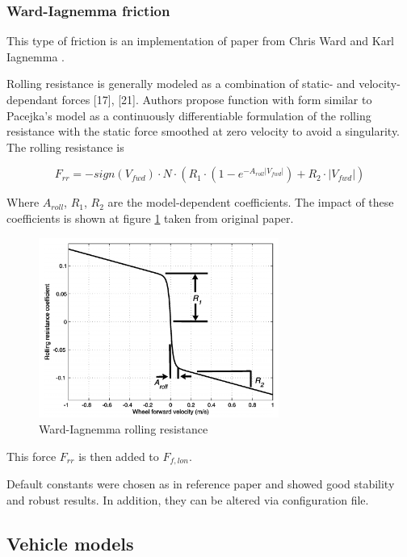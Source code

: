 \documentclass[a4paper,11pt]{article}
\begin{document}
\newpage
\subsubsection{Ward-Iagnemma friction}\label{sec:wi_friction}
This type of friction is an implementation of paper from Chris Ward and Karl Iagnemma \cite{ward-iagnemma-friction}.

Rolling resistance is generally modeled as a combination of
static- and velocity-dependant forces [17], [21]. Authors propose function with form similar to Pacejka's model \cite{pacejka_tire_model} as a continuously differentiable
formulation of the rolling resistance with the static force
smoothed at zero velocity to avoid a singularity. The rolling
resistance is


$$
F_{rr} = −sign(V_{fwd}) \cdot N \cdot (R_1 \cdot (1 − e^{−A_{roll} |V_{fwd} |}
)+R_2 \cdot |V_{fwd}|)
$$


Where $A_{roll}$, $R_1$, $R_2$ are the model-dependent coefficients. The impact of these coefficients is shown at figure \ref{fig:wi_rr} taken from original paper.

\begin{figure}[h!]
	\centerline{\includegraphics[width = 0.7\textwidth]{imgs/wi_rr}}
	\caption{Ward-Iagnemma rolling resistance}
	\label{fig:wi_rr}
\end{figure}

This force $F_{rr}$ is then added to $F_{f,lon}$.

Default constants were chosen as in reference paper and showed good stability and robust results. In addition, they can be altered via configuration file.



\newpage


\subsection{Vehicle models} \label{vehicle_models}
\end{document}
